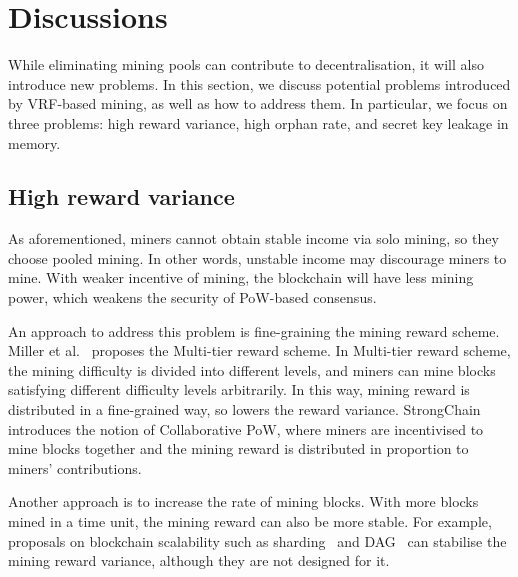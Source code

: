 \section{Discussions}
\label{sec:discussions}

While eliminating mining pools can contribute to decentralisation, it will also introduce new problems.
In this section, we discuss potential problems introduced by VRF-based mining, as well as how to address them.
In particular, we focus on three problems: high reward variance, high orphan rate, and secret key leakage in memory.

\subsection{High reward variance}

As aforementioned, miners cannot obtain stable income via solo mining, so they choose pooled mining.
In other words, unstable income may discourage miners to mine.
With weaker incentive of mining, the blockchain will have less mining power, which weakens the security of PoW-based consensus.

An approach to address this problem is fine-graining the mining reward scheme.
Miller et al.~\cite{miller2015nonoutsourceable} proposes the Multi-tier reward scheme.
In Multi-tier reward scheme, the mining difficulty is divided into different levels, and miners can mine blocks satisfying different difficulty levels arbitrarily.
In this way, mining reward is distributed in a fine-grained way, so lowers the reward variance.
StrongChain~\cite{szalachowski2019strongchain} introduces the notion of Collaborative PoW, where miners are incentivised to mine blocks together and the mining reward is distributed in proportion to miners' contributions.

Another approach is to increase the rate of mining blocks.
With more blocks mined in a time unit, the mining reward can also be more stable.
For example, proposals on blockchain scalability such as sharding~\cite{wang2019monoxide} and DAG~\cite{li2018scaling} can stabilise the mining reward variance, although they are not designed for it.






